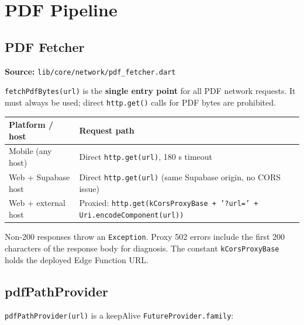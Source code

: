 \documentclass[11pt,a4paper]{article}
\begin{document}
\section{PDF Pipeline}

\subsection{PDF Fetcher}

\textbf{Source:} \texttt{lib/core/network/pdf\_fetcher.dart}

\texttt{fetchPdfBytes(url)} is the \textbf{single entry point} for all PDF network
requests. It must always be used; direct \texttt{http.get()} calls for PDF bytes are
prohibited.

\vspace{4pt}
\begin{tabularx}{\textwidth}{@{}L{4.0cm} L{9.6cm}@{}}
  \toprule
  \textbf{Platform / host} & \textbf{Request path} \\
  \midrule
  Mobile (any host) & Direct \texttt{http.get(url)}, 180 s timeout \\
  Web + Supabase host & Direct \texttt{http.get(url)} (same Supabase origin, no CORS
    issue) \\
  Web + external host & Proxied: \texttt{http.get(kCorsProxyBase + '?url=' +
    Uri.encodeComponent(url))} \\
  \bottomrule
\end{tabularx}
\vspace{2pt}

Non-200 responses throw an \texttt{Exception}. Proxy 502 errors include the first
200 characters of the response body for diagnosis. The constant \texttt{kCorsProxyBase}
holds the deployed Edge Function URL.

\subsection{pdfPathProvider}

\texttt{pdfPathProvider(url)} is a keepAlive \texttt{FutureProvider.family}:
\end{document}

